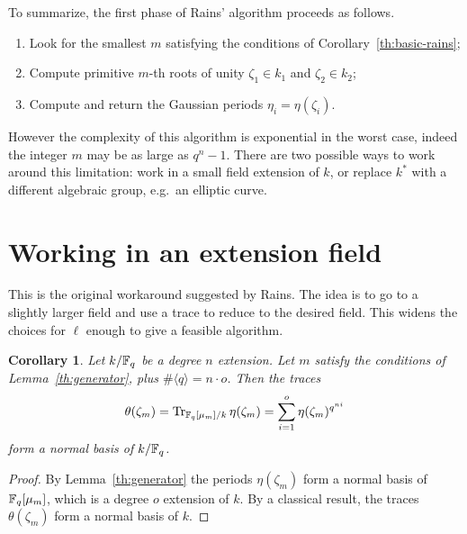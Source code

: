 \documentclass{article}
\newtheorem{Coro}{Corollary}
\begin{document}
To summarize, the first phase of Rains' algorithm proceeds as follows.

\begin{enumerate}
\item Look for the smallest $m$ satisfying the conditions of
  Corollary~\ref{th:basic-rains};
\item Compute primitive $m$-th roots of unity $\zeta_1\in k_1$ and
  $\zeta_2\in k_2$;
\item Compute and return the Gaussian periods $\eta_i=\eta(\zeta_i)$.
\end{enumerate}

However the complexity of this algorithm is exponential in the worst
case, indeed the integer $m$ may be as large as $q^n-1$. There are two
possible ways to work around this limitation: work in a small field
extension of $k$, or replace $k^\ast$ with a different algebraic
group, e.g.\ an elliptic curve.

\section{Working in an extension field}

This is the original workaround suggested by Rains. The idea is to go
to a slightly larger field and use a trace to reduce to the desired
field. This widens the choices for $\ell$ enough to give a feasible
algorithm.

\begin{Coro}
  \label{th:rains}
  Let $k/\mathbb{F}_q$ be a degree $n$ extension. Let $m$ satisfy the
  conditions of Lemma~\ref{th:generator}, plus $\#\langle q\rangle =
  n\cdot o$.  Then the traces
  \begin{equation}
    \theta(\zeta_m) = \operatorname{Tr}_{\mathbb{F}_q[\mu_m]/k}\eta(\zeta_m) = \sum_{i=1}^o \eta(\zeta_m)^{q^{ni}}
  \end{equation}
  form a normal basis of $k/\mathbb{F}_q$.
\end{Coro}
\begin{proof}
  By Lemma~\ref{th:generator} the periods $\eta(\zeta_m)$ form a
  normal basis of $\mathbb{F}_q[\mu_m]$, which is a degree $o$ extension of
  $k$. By a classical result, the traces $\theta(\zeta_m)$ form a
  normal basis of $k$.
\end{proof}
\end{document}
